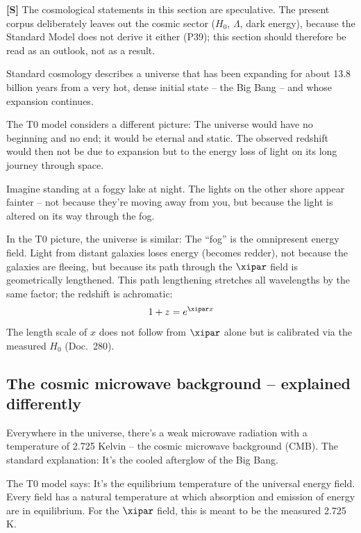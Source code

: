 	\textbf{[S]} The cosmological statements in this section are speculative. The present corpus deliberately leaves out the cosmic sector ($H_0$, $\Lambda$, dark energy), because the Standard Model does not derive it either (P39); this section should therefore be read as an outlook, not as a result.

	Standard cosmology describes a universe that has been expanding for about 13.8 billion years from a very hot, dense initial state -- the Big Bang -- and whose expansion continues.

	The T0 model considers a different picture: The universe would have no beginning and no end; it would be eternal and static. The observed redshift would then not be due to expansion but to the energy loss of light on its long journey through space.
	
	\begin{revolutionary}
		Imagine standing at a foggy lake at night. The lights on the other shore appear fainter -- not because they're moving away from you, but because the light is altered on its way through the fog.

		In the T0 picture, the universe is similar: The ``fog'' is the omnipresent energy field. Light from distant galaxies loses energy (becomes redder), not because the galaxies are fleeing, but because its path through the $\xipar$ field is geometrically lengthened. This path lengthening stretches all wavelengths by the same factor; the redshift is achromatic:
		\begin{equation}
			1 + z = e^{\xipar x}
		\end{equation}
		The length scale of $x$ does not follow from $\xipar$ alone but is calibrated via the measured $H_0$ (Doc.~280).
	\end{revolutionary}


	\subsection{The cosmic microwave background -- explained differently}
	
	Everywhere in the universe, there's a weak microwave radiation with a temperature of 2.725 Kelvin -- the cosmic microwave background (CMB). The standard explanation: It's the cooled afterglow of the Big Bang.
	
	The T0 model says: It's the equilibrium temperature of the universal energy field. Every field has a natural temperature at which absorption and emission of energy are in equilibrium. For the $\xipar$ field, this is meant to be the measured 2.725 K.
	
